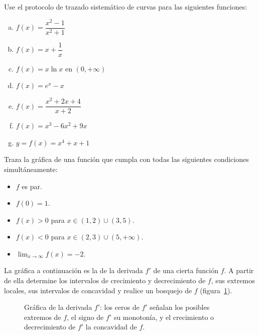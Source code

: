 \begin{prob}
Use el protocolo de trazado sistemático de curvas para las siguientes funciones:
\begin{enumerate}[a)]
    \item $f(x)=\dfrac{x^2-1}{x^2+1}$
    \item $f(x)=x+\dfrac{1}{x}$
    \item $f(x)=x\ln x$ en $(0,+\infty)$
    \item $f(x)=e^x-x$
    \item $f(x)=\dfrac{x^2+2x+4}{x+2}$
    \item $f(x)=x^3-6x^2+9x$
   \item $y=f(x)=x^4+x+1$
\end{enumerate}
\end{prob}


\begin{prob}
Traza la gráfica de una función que cumpla con todas las siguientes
condiciones simultáneamente:
\begin{itemize}
    \item $f$ es par.
    \item $f(0)=1$.
    \item $f(x)>0$ para $x\in(1,2)\cup(3,5)$.
    \item $f(x)<0$ para $x\in(2,3)\cup(5,+\infty)$.
    \item $\displaystyle\lim_{x\to\infty}f(x)=-2$.
\end{itemize}
\end{prob}

\begin{prob}
La gráfica a continuación es la de la derivada $f'$ de una cierta
función $f$. A partir de ella determine los intervalos de crecimiento
y decrecimiento de $f$, sus extremos locales, sus intervalos de
concavidad y realice un bosquejo de $f$ (figura~\ref{fig:grafica_fprima}).
\begin{figure}[!htbp]
\centering
{}
\caption{Gráfica de la derivada $f'$: los ceros de $f'$ señalan los posibles
  extremos de $f$, el signo de $f'$ su monotonía, y el crecimiento o
  decrecimiento de $f'$ la concavidad de $f$.}
\label{fig:grafica_fprima}
\end{figure}
\end{prob}


